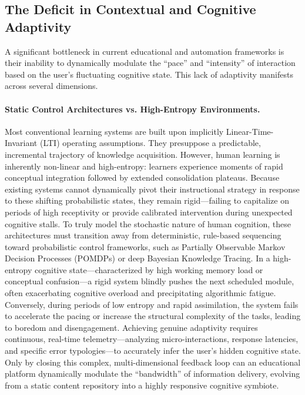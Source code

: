 \subsection{The Deficit in Contextual and Cognitive Adaptivity}

A significant bottleneck in current educational and automation frameworks is their inability to dynamically modulate the ``pace'' and ``intensity'' of interaction based on the user's fluctuating cognitive state. This lack of adaptivity manifests across several dimensions.

\paragraph{Static Control Architectures vs. High-Entropy Environments.}
Most conventional learning systems are built upon implicitly Linear-Time-Invariant (LTI) operating assumptions. They presuppose a predictable, incremental trajectory of knowledge acquisition.  However, human learning is inherently non-linear and high-entropy: learners experience moments of rapid conceptual integration followed by extended consolidation plateaus. Because existing systems cannot dynamically pivot their instructional strategy in response to these shifting probabilistic states, they remain rigid---failing to capitalize on periods of high receptivity or provide calibrated intervention during unexpected cognitive stalls. To truly model the stochastic nature of human cognition, these architectures must transition away from deterministic, rule-based sequencing toward probabilistic control frameworks, such as Partially Observable Markov Decision Processes (POMDPs) or deep Bayesian Knowledge Tracing.  In a high-entropy cognitive state---characterized by high working memory load or conceptual confusion---a rigid system blindly pushes the next scheduled module, often exacerbating cognitive overload and precipitating algorithmic fatigue. Conversely, during periods of low entropy and rapid assimilation, the system fails to accelerate the pacing or increase the structural complexity of the tasks, leading to boredom and disengagement. Achieving genuine adaptivity requires continuous, real-time telemetry---analyzing micro-interactions, response latencies, and specific error typologies---to accurately infer the user's hidden cognitive state. Only by closing this complex, multi-dimensional feedback loop can an educational platform dynamically modulate the ``bandwidth'' of information delivery, evolving from a static content repository into a highly responsive cognitive symbiote.

